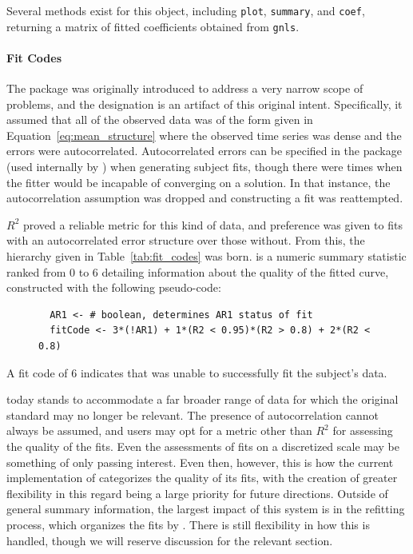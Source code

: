 Several methods exist for this object, including \texttt{plot}, \texttt{summary}, and \texttt{coef}, returning a matrix of fitted coefficients obtained from \texttt{gnls}. 


\paragraph{Fit Codes}\label{sec:fitcode}

The  package was originally introduced to address a very narrow scope of problems, and the  designation is an artifact of this original intent. Specifically, it assumed that all of the observed data was of the form given in Equation~\ref{eq:mean_structure} where the observed time series was dense and the errors were autocorrelated. Autocorrelated errors can be specified in the  package (used internally by ) when generating subject fits, though there were times when the fitter would be incapable of converging on  a solution. In that instance, the autocorrelation assumption was dropped and constructing a fit was reattempted.

$R^2$ proved a reliable metric for this kind of data, and preference was given to fits with an autocorrelated error structure over those without. From this, the hierarchy given in Table~\ref{tab:fit_codes} was born.  is a numeric summary statistic ranked from 0 to 6 detailing information about the quality of the fitted curve, constructed with the following pseudo-code:

\begin{singlespace}
\begin{figure}[H]
\centering
\begin{BVerbatim}
  AR1 <- # boolean, determines AR1 status of fit
  fitCode <- 3*(!AR1) + 1*(R2 < 0.95)*(R2 > 0.8) + 2*(R2 < 0.8)
\end{BVerbatim}
\end{figure}
\end{singlespace}

A fit code of 6 indicates that  was unable to successfully fit the 
subject's data. 

 today stands to accommodate a far broader range of data for which the original  standard may no longer be relevant. The presence of autocorrelation cannot always be assumed, and users may opt for a metric other than $R^2$ for assessing the quality of the fits. Even the assessments of fits on a discretized scale may be something of only passing interest. Even then, however, this is how the current implementation of  categorizes the quality of its fits, with the creation of greater flexibility in this regard being a large priority for future directions. Outside of general summary information, the largest impact of this system is in the refitting process, which organizes the fits by . There is still flexibility in how this is handled, though we will reserve discussion for the relevant section. 

